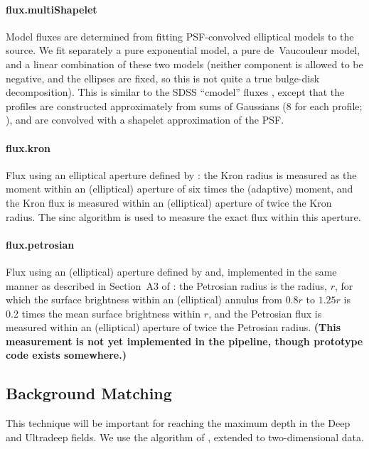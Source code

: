 \documentclass[12pt]{article}
\newcommand\tbd[1]{\textbf{\color{red}(#1)}}
\begin{document}
\paragraph{flux.multiShapelet}
Model fluxes are determined from fitting PSF-convolved elliptical models to the source.  We fit separately a
pure exponential model, a pure de\ Vaucouleur model, and a linear combination of these two models (neither
component is allowed to be negative, and the ellipses are fixed, so this is not quite a true bulge-disk
decomposition).  This is similar to the SDSS ``cmodel'' fluxes \citep{SdssPhoto}, except that the profiles are
constructed approximately from sums of Gaussians (8 for each profile; \citealt{HoggLangMoG}), and are
convolved with a shapelet approximation of the PSF.

\paragraph{flux.kron}
Flux using an elliptical aperture defined by \citet{1980ApJS...43..305K}: the Kron radius is measured as the
moment within an (elliptical) aperture of six times the (adaptive) moment, and the Kron flux is measured
within an (elliptical) aperture of twice the Kron radius.  The sinc algorithm is used to measure the exact
flux within this aperture.

\paragraph{flux.petrosian}
Flux using an (elliptical) aperture defined by \citet{1976ApJ...209L...1P} and, implemented in the same manner
as described in Section~A3 of \citet{2002AJ....124.1810S}: the Petrosian radius is the radius, $r$, for which
the surface brightness within an (elliptical) annulus from $0.8r$ to $1.25r$ is 0.2 times the mean surface
brightness within $r$, and the Petrosian flux is measured within an (elliptical) aperture of twice the
Petrosian radius.  \tbd{This measurement is not yet implemented in the pipeline, though prototype code exists
  somewhere.}



\subsection{Background Matching}
\label{alg:backgroundMatching}

This technique will be important for reaching the maximum depth in the Deep and Ultradeep fields.  We use the
algorithm of \citealt{2011arXiv1111.6958H}, extended to two-dimensional data.
\end{document}

